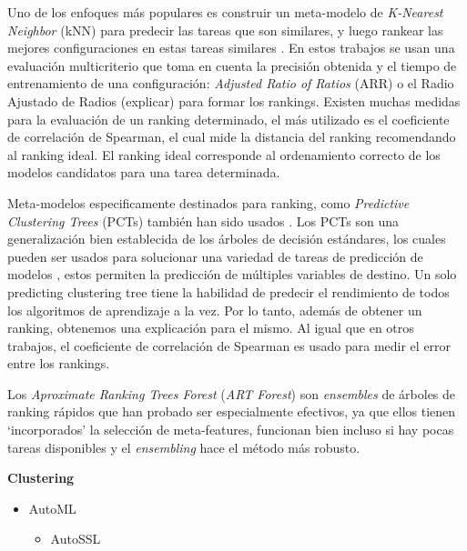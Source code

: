 Uno de los enfoques más populares es construir un meta-modelo de \textit{K-Nearest Neighbor} (kNN) para predecir las tareas que son similares, y luego rankear las mejores configuraciones en estas tareas similares \cite{santos2004selection, bradzil2003ranking}. En estos trabajos se usan una evaluación multicriterio que toma en cuenta la precisión obtenida y el tiempo de entrenamiento de una configuración: \textit{Adjusted Ratio of Ratios} (ARR) o el Radio Ajustado de Radios (explicar) para formar los rankings. Existen muchas medidas para la evaluación de un ranking determinado, el más utilizado es el coeficiente de correlación de Spearman, el cual mide la distancia del ranking recomendando al ranking ideal. El ranking ideal corresponde al ordenamiento correcto de los modelos candidatos para una tarea determinada.
 
Meta-modelos especificamente destinados para ranking, como \textit{Predictive Clustering Trees} (PCTs) también han sido usados \cite{todorovski2002ranking}. Los PCTs son una generalización bien establecida de los árboles de decisión estándares, los cuales pueden ser usados para solucionar una variedad de tareas de predicción de modelos \cite{tomaz2020oblique}, estos permiten la predicción de múltiples variables de destino. Un solo predicting clustering tree tiene la habilidad de predecir el rendimiento de todos los algoritmos de aprendizaje a la vez. Por lo tanto, además de obtener un ranking, obtenemos una explicación para el mismo. Al igual que en otros trabajos, el coeficiente de correlación de Spearman es usado para medir el error entre los rankings.
 
Los \textit{Aproximate Ranking Trees Forest} (\textit{ART Forest}) \cite{sun2013pairwise} son \textit{ensembles} de árboles de ranking rápidos que han probado ser especialmente efectivos, ya que ellos tienen `incorporados' la selección de meta-features, funcionan bien incluso si hay pocas tareas disponibles y el \textit{ensembling} hace el método más robusto.


\quad

\textbf{Clustering}

\begin{itemize}
	\item AutoML \begin{itemize}
		\item AutoSSL
	\end{itemize}
\end{itemize}

\quad

